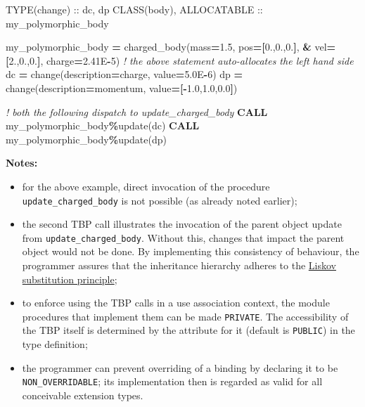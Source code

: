 \documentclass[
  paper=a4,
  ,captions=tableheading
]{scrartcl}
\newenvironment{Shaded}{\begin{snugshade}}{\end{snugshade}}
\newcommand{\CommentTok}[1]{\textcolor[rgb]{0.56,0.35,0.01}{\textit{#1}}}
\newcommand{\DataTypeTok}[1]{\textcolor[rgb]{0.13,0.29,0.53}{#1}}
\newcommand{\DecValTok}[1]{\textcolor[rgb]{0.00,0.00,0.81}{#1}}
\newcommand{\FloatTok}[1]{\textcolor[rgb]{0.00,0.00,0.81}{#1}}
\newcommand{\KeywordTok}[1]{\textcolor[rgb]{0.13,0.29,0.53}{\textbf{#1}}}
\newcommand{\NormalTok}[1]{#1}
\newcommand{\OperatorTok}[1]{\textcolor[rgb]{0.81,0.36,0.00}{\textbf{#1}}}
\newcommand{\StringTok}[1]{\textcolor[rgb]{0.31,0.60,0.02}{#1}}
\providecommand{\tightlist}{%
  \setlength{\itemsep}{0pt}\setlength{\parskip}{0pt}}
\begin{document}
\begin{Shaded}
\begin{Highlighting}[]
\DataTypeTok{TYPE(change)} \DataTypeTok{::}\NormalTok{  dc, dp}
\DataTypeTok{CLASS(body)}\NormalTok{, }\DataTypeTok{ALLOCATABLE} \DataTypeTok{::}\NormalTok{ my\_polymorphic\_body}

\NormalTok{my\_polymorphic\_body }\KeywordTok{=}\NormalTok{ charged\_body(mass}\KeywordTok{=}\FloatTok{1.5}\NormalTok{, pos}\KeywordTok{=[}\FloatTok{0.}\NormalTok{,}\FloatTok{0.}\NormalTok{,}\FloatTok{0.}\KeywordTok{]}\NormalTok{, }\KeywordTok{\&}
\NormalTok{                                   vel}\KeywordTok{=[}\FloatTok{2.}\NormalTok{,}\FloatTok{0.}\NormalTok{,}\FloatTok{0.}\KeywordTok{]}\NormalTok{, charge}\KeywordTok{=}\FloatTok{2.41}\NormalTok{E}\KeywordTok{{-}}\DecValTok{5}\NormalTok{)}
\CommentTok{!  the above statement auto{-}allocates the left hand side}
\NormalTok{dc }\KeywordTok{=}\NormalTok{ change(description}\KeywordTok{=}\StringTok{\textquotesingle{}charge\textquotesingle{}}\NormalTok{, }\DataTypeTok{value}\KeywordTok{=}\FloatTok{5.0}\NormalTok{E}\KeywordTok{{-}}\DecValTok{6}\NormalTok{)}
\NormalTok{dp }\KeywordTok{=}\NormalTok{ change(description}\KeywordTok{=}\StringTok{\textquotesingle{}momentum\textquotesingle{}}\NormalTok{, }\DataTypeTok{value}\KeywordTok{=[{-}}\FloatTok{1.0}\NormalTok{,}\FloatTok{1.0}\NormalTok{,}\FloatTok{0.0}\KeywordTok{]}\NormalTok{)}

\CommentTok{! both the following dispatch to update\_charged\_body}
\KeywordTok{CALL}\NormalTok{ my\_polymorphic\_body}\OperatorTok{\%}\NormalTok{update(dc)}
\KeywordTok{CALL}\NormalTok{ my\_polymorphic\_body}\OperatorTok{\%}\NormalTok{update(dp)}
\end{Highlighting}
\end{Shaded}

\textbf{Notes:}

\begin{itemize}
\tightlist
\item
  for the above example, direct invocation of the procedure
  \texttt{update\_charged\_body} is not possible (as already noted
  earlier);
\item
  the second TBP call illustrates the invocation of the parent object
  update from \texttt{update\_charged\_body}. Without this, changes that
  impact the parent object would not be done. By implementing this
  consistency of behaviour, the programmer assures that the inheritance
  hierarchy adheres to the
  \href{https://en.wikipedia.org/wiki/Liskov_substitution_principle}{Liskov
  substitution principle};
\item
  to enforce using the TBP calls in a use association context, the
  module procedures that implement them can be made \texttt{PRIVATE}.
  The accessibility of the TBP itself is determined by the attribute for
  it (default is \texttt{PUBLIC}) in the type definition;
\item
  the programmer can prevent overriding of a binding by declaring it to
  be \texttt{NON\_OVERRIDABLE}; its implementation then is regarded as
  valid for all conceivable extension types.
\end{itemize}
\end{document}
